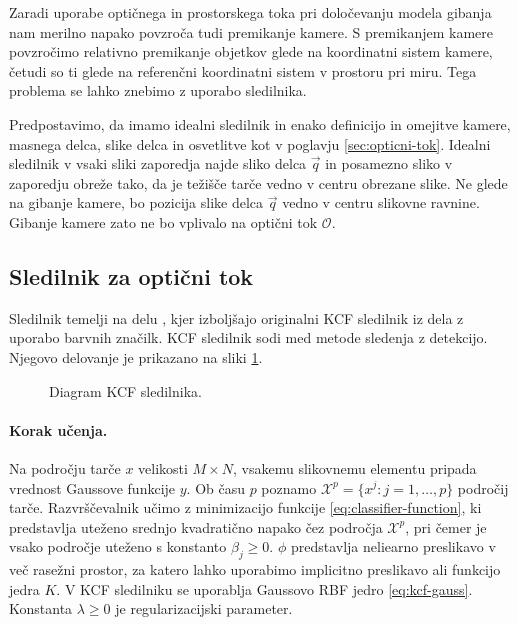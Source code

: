 Zaradi uporabe optičnega in prostorskega toka pri določevanju modela gibanja nam merilno napako povzroča tudi premikanje kamere. S premikanjem kamere povzročimo relativno premikanje objetkov glede na koordinatni sistem kamere, četudi so ti glede na referenčni koordinatni sistem v prostoru pri miru. Tega problema se lahko znebimo z uporabo sledilnika. 

Predpostavimo, da imamo idealni sledilnik in enako definicijo in omejitve kamere, masnega delca, slike delca in osvetlitve kot v poglavju \ref{sec:opticni-tok}. Idealni sledilnik v vsaki sliki zaporedja najde sliko delca $\vec{q}$ in posamezno sliko v zaporedju obreže tako, da je težišče tarče vedno v centru obrezane slike. Ne glede na gibanje kamere, bo pozicija slike delca $\vec{q}$ vedno v centru slikovne ravnine. Gibanje kamere zato ne bo vplivalo na optični tok $\mathcal{O}$.



\subsection{Sledilnik za optični tok} 
Sledilnik temelji na delu \cite{danelljan2014adaptive}, kjer izboljšajo originalni KCF sledilnik iz dela \cite{henriques2012exploiting} z uporabo barvnih značilk. KCF sledilnik sodi med metode sledenja z detekcijo. Njegovo delovanje je prikazano na sliki \ref{fig:diagram-kcf}.

\begin{figure}[htb]
	\centering
	
	\caption[Diagram KCF sledilnika]{Diagram KCF sledilnika.}
	\label{fig:diagram-kcf}
\end{figure}


\paragraph{Korak učenja.}
Na področju tarče $x$ velikosti $M \times N$, vsakemu slikovnemu elementu pripada vrednost Gaussove funkcije $y$. Ob času $p$ poznamo $\mathcal{X}^p = \{x^j: j=1,\ldots,p\}$ področij tarče. Razvrščevalnik učimo z minimizacijo funkcije \eqref{eq:classifier-function}, ki predstavlja uteženo srednjo kvadratično napako čez področja $\mathcal{X}^p$, pri čemer je vsako področje uteženo s konstanto $\beta_j \geq 0$. $\phi$ predstavlja neliearno preslikavo v več rasežni prostor, za katero lahko uporabimo implicitno preslikavo ali funkcijo jedra $K$. V KCF sledilniku se uporablja Gaussovo RBF jedro \eqref{eq:kcf-gauss}. Konstanta $\lambda \geq 0$ je regularizacijski parameter.

